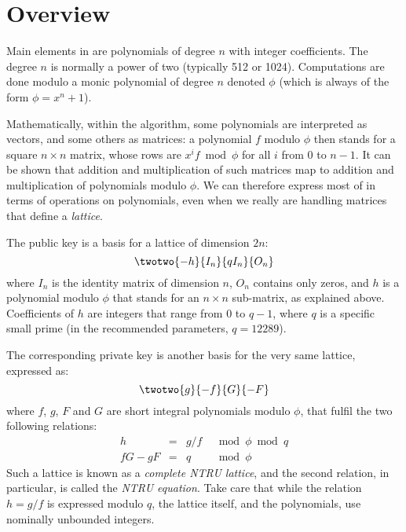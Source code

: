 \section{Overview}\label{sec:spec:overview}

Main elements in \falcon are polynomials of degree $n$ with integer
coefficients. The degree $n$ is normally a power of two (typically 512 or
1024). Computations are done modulo a monic polynomial of degree $n$ denoted
$\phi$ (which is always of the form $\phi = x^n + 1$).


Mathematically, within the algorithm, some polynomials are interpreted as
vectors, and some others as matrices: a polynomial $f$ modulo $\phi$
then stands for a square $n\times n$ matrix, whose rows are $x^if \bmod
\phi$ for all $i$ from $0$ to $n-1$. It can be shown that addition and
multiplication of such matrices map to addition and multiplication of
polynomials modulo $\phi$. We can therefore express most of \falcon in
terms of operations on polynomials, even when we really are handling
matrices that define a \emph{lattice}.

The public key is a basis for a lattice of dimension $2n$:
\begin{equation}
  \twotwo{-h}{I_n}{qI_n}{O_n}
\end{equation}
where $I_n$ is the identity matrix of dimension $n$, $O_n$ contains
only zeros, and $h$ is a polynomial modulo $\phi$ that stands for an
$n\times n$ sub-matrix, as explained above. Coefficients of $h$ are
integers that range from $0$ to $q-1$, where $q$ is a specific small
prime (in the recommended parameters, $q = 12289$).

The corresponding private key is another basis for the very same lattice,
expressed as:
\begin{equation}
  \twotwo{g}{-f}{G}{-F}
\end{equation}
where $f$, $g$, $F$ and $G$ are short integral polynomials modulo $\phi$,
that fulfil the two following relations:
\begin{equation}
  \begin{array}{rcll}
    h &=& g/f &\mod \phi \bmod q \\
    fG - gF &=& q &\mod \phi
  \end{array}
\end{equation}
Such a lattice is known as a \emph{complete NTRU lattice}, and the second
relation, in particular, is called the \emph{NTRU equation}. Take care
that while the relation $h = g/f$ is expressed modulo $q$, the lattice
itself, and the polynomials, use nominally unbounded integers.

